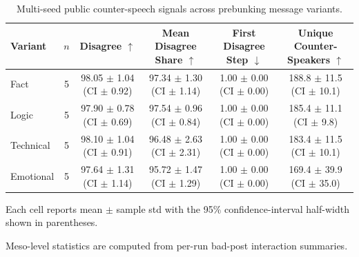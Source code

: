 \begin{table}[t]
\centering
\small
\caption{Multi-seed public counter-speech signals across prebunking message variants.}
\label{tab:prebunking_variant_meso_results}
\begin{threeparttable}
\begin{tabular}{lccccc}
\toprule
Variant & $n$ & Disagree $\uparrow$ & Mean Disagree Share $\uparrow$ & First Disagree Step $\downarrow$ & Unique Counter-Speakers $\uparrow$ \\
\midrule
Fact & 5 & 98.05 $\pm$ 1.04 (CI $\pm$ 0.92) & 97.34 $\pm$ 1.30 (CI $\pm$ 1.14) & 1.00 $\pm$ 0.00 (CI $\pm$ 0.00) & 188.8 $\pm$ 11.5 (CI $\pm$ 10.1) \\
Logic & 5 & 97.90 $\pm$ 0.78 (CI $\pm$ 0.69) & 97.54 $\pm$ 0.96 (CI $\pm$ 0.84) & 1.00 $\pm$ 0.00 (CI $\pm$ 0.00) & 185.4 $\pm$ 11.1 (CI $\pm$ 9.8) \\
Technical & 5 & 98.10 $\pm$ 1.04 (CI $\pm$ 0.91) & 96.48 $\pm$ 2.63 (CI $\pm$ 2.31) & 1.00 $\pm$ 0.00 (CI $\pm$ 0.00) & 183.4 $\pm$ 11.5 (CI $\pm$ 10.1) \\
Emotional & 5 & 97.64 $\pm$ 1.31 (CI $\pm$ 1.14) & 95.72 $\pm$ 1.47 (CI $\pm$ 1.29) & 1.00 $\pm$ 0.00 (CI $\pm$ 0.00) & 169.4 $\pm$ 39.9 (CI $\pm$ 35.0) \\
\bottomrule
\end{tabular}
\begin{tablenotes}[flushleft]
\footnotesize
\item Each cell reports mean $\pm$ sample std with the 95\% confidence-interval half-width shown in parentheses.
\item Meso-level statistics are computed from per-run bad-post interaction summaries.
\end{tablenotes}
\end{threeparttable}
\end{table}
